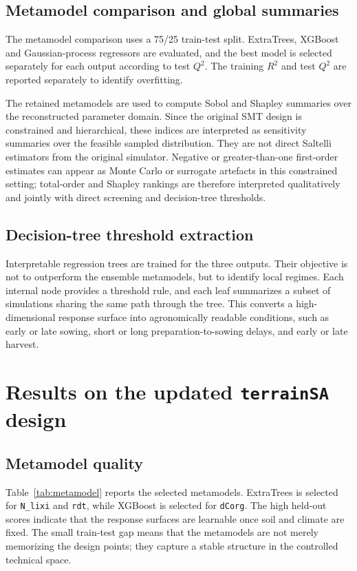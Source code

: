 \documentclass[11pt,a4paper]{article}
\newcommand{\param}[1]{\texttt{#1}}
\begin{document}
\subsection{Metamodel comparison and global summaries}

The metamodel comparison uses a 75/25 train-test split. ExtraTrees, XGBoost and Gaussian-process regressors are evaluated, and the best model is selected separately for each output according to test $Q^2$. The training $R^2$ and test $Q^2$ are reported separately to identify overfitting.

The retained metamodels are used to compute Sobol and Shapley summaries over the reconstructed parameter domain. Since the original SMT design is constrained and hierarchical, these indices are interpreted as sensitivity summaries over the feasible sampled distribution. They are not direct Saltelli estimators from the original simulator. Negative or greater-than-one first-order estimates can appear as Monte Carlo or surrogate artefacts in this constrained setting; total-order and Shapley rankings are therefore interpreted qualitatively and jointly with direct screening and decision-tree thresholds.

\subsection{Decision-tree threshold extraction}

Interpretable regression trees are trained for the three outputs. Their objective is not to outperform the ensemble metamodels, but to identify local regimes. Each internal node provides a threshold rule, and each leaf summarizes a subset of simulations sharing the same path through the tree. This converts a high-dimensional response surface into agronomically readable conditions, such as early or late sowing, short or long preparation-to-sowing delays, and early or late harvest.

\section{Results on the updated \texttt{terrainSA} design}

\subsection{Metamodel quality}

Table~\ref{tab:metamodel} reports the selected metamodels. ExtraTrees is selected for \param{N\_lixi} and \param{rdt}, while XGBoost is selected for \param{dCorg}. The high held-out scores indicate that the response surfaces are learnable once soil and climate are fixed. The small train-test gap means that the metamodels are not merely memorizing the design points; they capture a stable structure in the controlled technical space.
\end{document}
